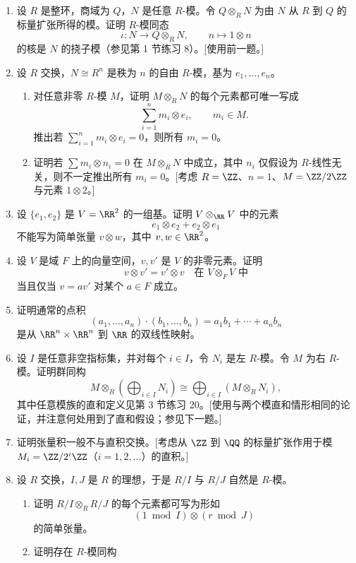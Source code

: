 \begin{enumerate}[label=\arabic*.]
\begin{enumerate}[label=(\alph*)]
	\end{enumerate}
	\item 设 $R$ 是整环，商域为 $Q$，$N$ 是任意 $R$-模。令 $Q\otimes_RN$ 为由 $N$ 从 $R$ 到 $Q$ 的标量扩张所得的模。证明 $R$-模同态
	\[
	\iota:N\longrightarrow Q\otimes_RN,
	\qquad n\longmapsto 1\otimes n
	\]
	的核是 $N$ 的挠子模（参见第 1 节练习 8）。[使用前一题。]
	\item 设 $R$ 交换，$N\cong R^n$ 是秩为 $n$ 的自由 $R$-模，基为 $e_1,
	\ldots,e_n$。
	\begin{enumerate}[label=(\alph*)]
		\item 对任意非零 $R$-模 $M$，证明 $M\otimes_R N$ 的每个元素都可唯一写成
		\[
		\sum_{i=1}^n m_i\otimes e_i,
		\qquad m_i\in M.
		\]
		推出若 $\sum_{i=1}^n m_i\otimes e_i=0$，则所有 $m_i=0$。
		\item 证明若 $\sum m_i\otimes n_i=0$ 在 $M\otimes_R N$ 中成立，其中 $n_i$ 仅假设为 $R$-线性无关，则不一定推出所有 $m_i=0$。[考虑 $R=\ZZ$、$n=1$、$M=\ZZ/2\ZZ$ 与元素 $1\otimes2$。]
	\end{enumerate}
	\item 设 $\{e_1,e_2\}$ 是 $V=\RR^2$ 的一组基。证明 $V\otimes_{\RR}V$ 中的元素
	\[
	e_1\otimes e_2+e_2\otimes e_1
	\]
	不能写为简单张量 $v\otimes w$，其中 $v,w\in\RR^2$。
	\item 设 $V$ 是域 $F$ 上的向量空间，$v,v'$ 是 $V$ 的非零元素。证明
	\[
	v\otimes v'=v'\otimes v\quad\text{在 }V\otimes_FV\text{ 中}
	\]
	当且仅当 $v=av'$ 对某个 $a\in F$ 成立。
	\item 证明通常的点积
	\[
	(a_1,\ldots,a_n)\cdot(b_1,\ldots,b_n)=a_1b_1+\cdots+a_nb_n
	\]
	是从 $\RR^n\times\RR^n$ 到 $\RR$ 的双线性映射。
	\item 设 $I$ 是任意非空指标集，并对每个 $i\in I$，令 $N_i$ 是左 $R$-模。令 $M$ 为右 $R$-模。证明群同构
	\[
	M\otimes_R\left(\bigoplus_{i\in I}N_i\right)
	\cong \bigoplus_{i\in I}(M\otimes_R N_i),
	\]
	其中任意模族的直和定义见第 3 节练习 20。[使用与两个模直和情形相同的论证，并注意何处用到了直和假设；参见下一题。]
	\item 证明张量积一般不与直积交换。[考虑从 $\ZZ$ 到 $\QQ$ 的标量扩张作用于模 $M_i=\ZZ/2^i\ZZ$（$i=1,2,\ldots$）的直积。]
	\item 设 $R$ 交换，$I,J$ 是 $R$ 的理想，于是 $R/I$ 与 $R/J$ 自然是 $R$-模。
	\begin{enumerate}[label=(\alph*)]
		\item 证明 $R/I\otimes_RR/J$ 的每个元素都可写为形如
		\[
		(1\bmod I)\otimes(r\bmod J)
		\]
		的简单张量。
		\item 证明存在 $R$-模同构

\end{enumerate}
\end{enumerate}
